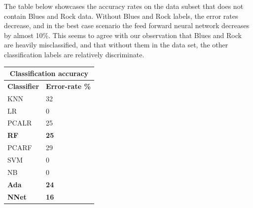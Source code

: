\documentclass{article} %
\begin{document}
The table below showcases the accuracy rates on the data subset that does not contain Blues and Rock data. Without Blues and Rock labels, the error rates decrease, and in the best case scenario the feed forward neural network decreases by almost 10\%. This seems to agree with our observation that Blues and Rock are heavily misclassified, and that without them in the data set, the other classification labels are relatively discriminate.
\begin{center}
	\begin{tabular}{ |p{2cm}|p{2.3cm}|}
		\hline
		\multicolumn{2}{|c|}{\textbf{Classification accuracy}} \\
		\hline
		\textbf{Classifier} & \textbf{Error-rate \%} \\
		\hline
		KNN & 32 \\
		LR & 0  \\
		PCALR & 25 \\
		\textbf{RF}    &  \textbf{25} \\
		PCARF & 29 \\
		SVM & 0 \\
		NB & 0 \\
		\textbf{Ada} & \textbf{24} \\
		\textbf{NNet} & \textbf{16} \\
		\hline
	\end{tabular}
\end{center}
\end{document}
